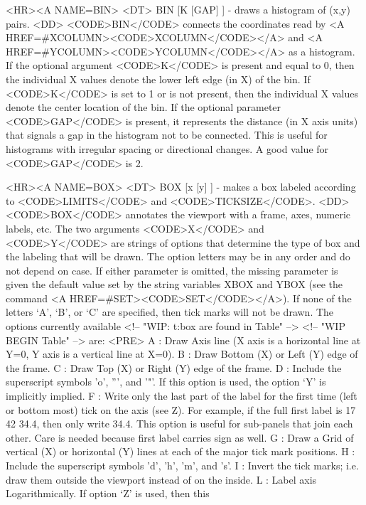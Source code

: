 \begin{rawhtml}
<HR><A NAME=BIN>
<DT>
BIN [K [GAP] ] - draws a histogram of (x,y) pairs.
<DD>
	<CODE>BIN</CODE> connects the coordinates read by
	<A HREF=#XCOLUMN><CODE>XCOLUMN</CODE></A> and
	<A HREF=#YCOLUMN><CODE>YCOLUMN</CODE></A> as a histogram.  If
	the optional argument <CODE>K</CODE> is present and equal to 0,
	then the individual X values denote the lower left edge (in X)
	of the bin.  If <CODE>K</CODE> is set to 1 or is not present,
	then the individual X values denote the center location of the
	bin.  If the optional parameter <CODE>GAP</CODE> is present, it
	represents the distance (in X axis units) that signals a gap in
	the histogram not to be connected.  This is useful for histograms
	with irregular spacing or directional changes.  A good value
	for <CODE>GAP</CODE> is 2.

<HR><A NAME=BOX>
<DT>
BOX [x [y] ] - makes a box labeled according to <CODE>LIMITS</CODE> and <CODE>TICKSIZE</CODE>.
<DD>
	<CODE>BOX</CODE> annotates the viewport with a frame, axes,
	numeric labels, etc.  The two arguments <CODE>X</CODE> and
	<CODE>Y</CODE> are strings of options that determine the type
	of box and the labeling that will be drawn.  The option letters
	may be in any order and do not depend on case.  If either
	parameter is omitted, the missing parameter is given the
	default value set by the string variables XBOX and YBOX (see
	the command <A HREF=#SET><CODE>SET</CODE></A>).  If none of the
	letters `A', `B', or `C' are specified, then tick marks will
	not be drawn.  The options currently available
<!-- "WIP: t:box are found in Table" -->
<!-- "WIP BEGIN Table" -->
	are:
	<PRE>
  A : Draw Axis line (X axis is a horizontal line at Y=0, Y axis
      is a vertical line at X=0).
  B : Draw Bottom (X) or Left (Y) edge of the frame.
  C : Draw Top (X) or Right (Y) edge of the frame.
  D : Include the superscript symbols 'o', ''', and '"'.
      If this option is used, the option `Y' is implicitly implied.
  F : Write only the last part of the label for the first time
      (left or bottom most) tick on the axis (see Z).  For example,
      if the full first label is 17 42 34.4, then only write 34.4.
      This option is useful for sub-panels that join each other.
      Care is needed because first label carries sign as well.
  G : Draw a Grid of vertical (X) or horizontal (Y) lines at each of
      the major tick mark positions.
  H : Include the superscript symbols 'd', 'h', 'm', and 's'.
  I : Invert the tick marks; i.e. draw them outside the viewport
      instead of on the inside.
  L : Label axis Logarithmically.  If option `Z' is used, then this

\end{rawhtml}
